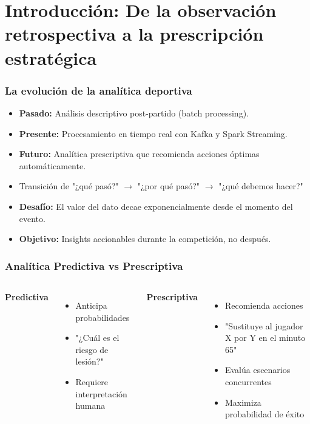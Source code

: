 \documentclass[aspectratio=169]{beamer}
\begin{document}
\section{Introducción: De la observación retrospectiva a la prescripción estratégica}
\frame{\sectionpage}

\begin{frame}\frametitle{La evolución de la analítica deportiva}
\begin{itemize}
    \item \textbf{Pasado:} Análisis descriptivo post-partido (batch processing).
    \item \textbf{Presente:} Procesamiento en tiempo real con Kafka y Spark Streaming.
    \item \textbf{Futuro:} Analítica prescriptiva que recomienda acciones óptimas automáticamente.
    \item Transición de "¿qué pasó?" $\rightarrow$ "¿por qué pasó?" $\rightarrow$ "¿qué debemos hacer?"
\end{itemize}
\vspace{0.1em}
\begin{itemize}
    \item \textbf{Desafío:} El valor del dato decae exponencialmente desde el momento del evento.
    \item \textbf{Objetivo:} Insights accionables durante la competición, no después.
\end{itemize}
\end{frame}

\begin{frame}\frametitle{Analítica Predictiva vs Prescriptiva}
\begin{columns}[T]
\textbf{Predictiva}
\begin{itemize}
    \item Anticipa probabilidades
    \item "¿Cuál es el riesgo de lesión?"
    \item Requiere interpretación humana
\end{itemize}

\textbf{Prescriptiva}
\begin{itemize}
    \item Recomienda acciones
    \item "Sustituye al jugador X por Y en el minuto 65"
    \item Evalúa escenarios concurrentes
    \item Maximiza probabilidad de éxito
\end{itemize}
\end{columns}
\end{frame}
\end{document}

